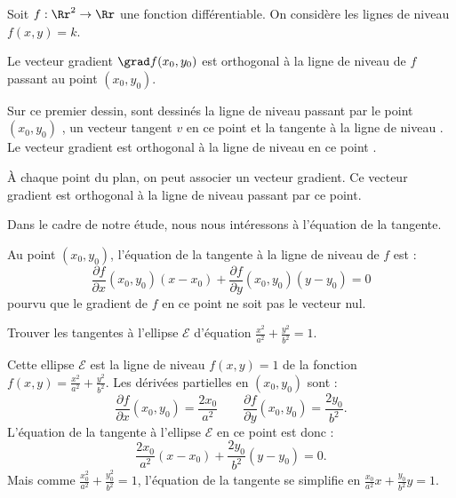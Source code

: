 \documentclass[11pt,class=report,crop=false]{standalone}
\begin{document}
Soit $f : \Rr^2 \to \Rr$ une fonction différentiable. On considère les lignes de niveau $f(x,y)=k$.


\begin{proposition}
Le vecteur gradient $\grad f(x_0,y_0)$ est orthogonal à la ligne de niveau de $f$ passant au point $(x_0,y_0)$. 
\end{proposition}


Sur ce premier dessin, sont dessinés la ligne de niveau passant par le point $(x_0,y_0)$ , un vecteur tangent $v$ en ce point et la tangente à la ligne de niveau . 
Le vecteur gradient est orthogonal à la ligne de niveau en ce point .


\bigskip


À chaque point du plan, on peut associer un vecteur gradient. Ce vecteur gradient est orthogonal à la ligne de niveau passant par ce point.


Dans le cadre de notre étude, nous nous intéressons à l'équation de la tangente.
\begin{proposition}
Au point $(x_0,y_0)$, l'équation de la tangente à la ligne de niveau de $f$ est :
$$\frac{\partial f}{\partial x}(x_0,y_0)(x-x_0)+\frac{\partial f}{\partial y}(x_0,y_0)(y-y_0)=0$$
pourvu que le gradient de $f$ en ce point ne soit pas le vecteur nul.
\end{proposition}



\begin{exemple}
Trouver les tangentes à l'ellipse $\mathcal{E}$ d'équation $\frac{x^2}{a^2}+\frac{y^2}{b^2} = 1$.


Cette ellipse $\mathcal{E}$ est la ligne de niveau $f(x,y)=1$ de la fonction
$f(x,y) = \frac{x^2}{a^2}+\frac{y^2}{b^2}$. 
Les dérivées partielles en $(x_0, y_0)$ sont :
$$\frac{\partial f}{\partial x}(x_0,y_0) = \frac{2x_0}{a^2} \qquad \frac{\partial f}{\partial y}(x_0,y_0) = \frac{2y_0}{b^2}.$$
L'équation de la tangente à l'ellipse $\mathcal{E}$ en ce point est donc :
$$\frac{2x_0}{a^2}(x-x_0)+\frac{2y_0}{b^2}(y-y_0)=0.$$
Mais comme $\frac{x_0^2}{a^2}+\frac{y_0^2}{b^2} = 1$, l'équation de la tangente se simplifie en $\displaystyle \frac{x_0}{a^2}x + \frac{y_0}{b^2} y = 1$.
\end{exemple}
\end{document}
